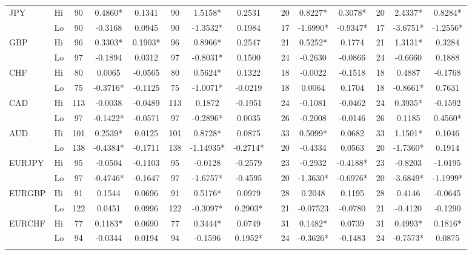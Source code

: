 \documentclass[ijfs,article,submit,oneauthor,pdftex,10pt,a4paper]{mdpi}
\begin{document}
{\begin{sidewaystable}
\begin{threeparttable}
\begin{tabular}{llccccccccccccc}
\multirow{2}{*}{JPY}
& Hi & 90 &0.4860* &0.1341 &90 &1.5158* &0.2531 & &20 &0.8227* &0.3078* &20 &2.4337* & 0.8284*  \\ 
& Lo & 90 &-0.3168 &0.0945 &90 &-1.3532* &0.1984 & &17 &-1.6990* &-0.9347* &17 &-3.6751* & -1.2556*  \\
\multirow{2}{*}{GBP}
& Hi & 96 &0.3303* &0.1903* &96 &0.8966* &0.2547 & &21 &0.5252* &0.1774 &21 &1.3131* &0.3284  \\ 
& Lo & 97 &-0.1894 &0.0312 &97 &-0.8031* &0.1500 & &24 &-0.2630 &-0.0866 &24 &-0.6660 &0.1888  \\
\multirow{2}{*}{CHF}
& Hi & 80 &0.0065 &-0.0565 &80 &0.5624* &0.1322 & &18 & -0.0022 & -0.1518 &18 &0.4887 &-0.1768  \\ 
& Lo & 75 &-0.3716* & -0.1125& 75 &-1.0071* &-0.0219 & &18 &0.0064 &0.1704 &18 &-0.8661* &0.7631  \\
\multirow{2}{*}{CAD}
& Hi & 113 &-0.0038 &-0.0489 &113 &0.1872 &-0.1951 & & 24 &-0.1081 & -0.0462 &24 &0.3935* & -0.1592  \\ 
& Lo & 97 &-0.1422* & -0.0571 & 97 & -0.2896* & 0.0035& & 26 & -0.2008 & -0.0146 &26 &0.1185 & 0.4560*  \\
\multirow{2}{*}{AUD}
& Hi & 101 &0.2539* &0.0125 &101 &0.8728* & 0.0875 &  &33 &0.5099* &0.0682 &33 & 1.1501*& 0.1046  \\ 
& Lo & 138 &-0.4384* & -0.1711 & 138 & -1.14935* & -0.2714* & &20 &-0.4334 & 0.0563 &20  & -1.7360* & 0.1914  \\
\multirow{2}{*}{EURJPY}
& Hi & 95 &-0.0504 &-0.1103 &95 &-0.0128 &-0.2579 & &23 &-0.2932 &-0.4188* &23 &-0.8203 & -1.0195  \\ 
& Lo & 97 &-0.4746* & -0.1647 &97 &-1.6757* &-0.4595 & &20 &-1.3630* & -0.6976* & 20 & -3.6849* &-1.1999*  \\
\multirow{2}{*}{EURGBP}
& Hi & 91 & 0.1544 &0.0696 &91 &0.5176* &0.0979 & &28 &0.2048 &0.1195 &28 & 0.4146 & -0.0645  \\ 
& Lo & 122 & 0.0451 & 0.0996 &122 &-0.3097* &0.2903* & & 21 &-0.07523 &-0.0780 &21 & -0.4120 &
-0.1290  \\
\multirow{2}{*}{EURCHF}
& Hi & 77 & 0.1183* & 0.0690 &77 & 0.3444* & 0.0749& & 	31 & 0.1482* &0.0739  &31 & 0.4993* 
& 0.1816*  \\ 
& Lo & 94 &-0.0344 & 0.0194 & 94 & -0.1596 &0.1952* & &24 & -0.3626* &-0.1483 & 24 & -0.7573* 
& 0.0875  \\
\hline
\label{tabref:RR1}
\end{tabular}
\begin{tablenotes}

\end{tablenotes}
\end{threeparttable}
\end{sidewaystable}}
\end{document}
